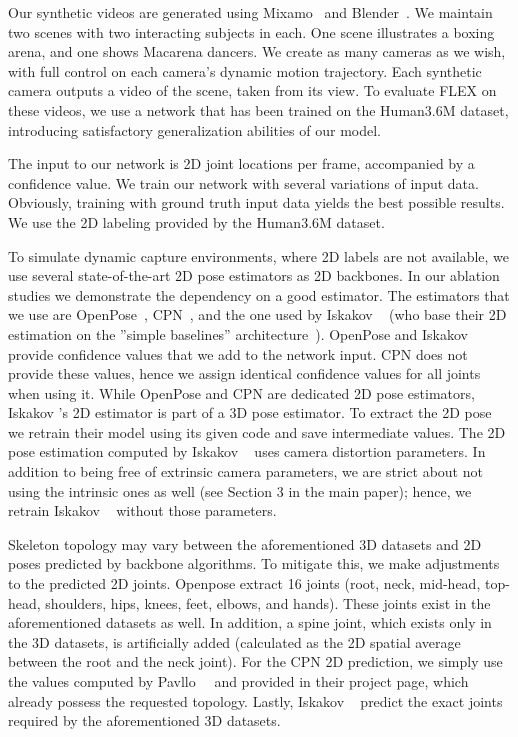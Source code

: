 Our synthetic videos are generated using Mixamo~\cite{mixamo} and Blender~\cite{blender}. We maintain two scenes with two interacting subjects in each. One scene illustrates a boxing arena, and one shows Macarena dancers. We create as many cameras as we wish, with full control on each camera's dynamic motion trajectory. Each synthetic camera outputs a video of the scene, taken from its view. To evaluate FLEX on these videos, we use a network that has been trained on the Human3.6M dataset, introducing satisfactory generalization abilities of our model.

 The input to our network is 2D joint locations per frame, accompanied by a confidence value. We train our network with several variations of input data.
 Obviously, training with ground truth input data yields the best possible results. We use the 2D labeling provided by the Human3.6M dataset. 

 To simulate dynamic capture environments, where 2D labels are not available, we use several state-of-the-art 2D pose estimators as 2D backbones. In our ablation studies we demonstrate the dependency on a good estimator. The estimators that we use are OpenPose~\cite{Cao:2018}, CPN~\cite{chen2018cascaded}, and the one used by Iskakov \etal~ (who base their 2D estimation on the ”simple baselines” architecture~\cite{xiao2018simple}). 
OpenPose and Iskakov \etal provide confidence values that we add to the network input. CPN does not provide these values, hence we assign identical confidence values for all joints when using it.
%
While OpenPose and CPN are dedicated 2D pose estimators, Iskakov \etal's 2D estimator is part of a 3D pose estimator. To extract the 2D pose we retrain their model using its given code and save intermediate values.
The 2D pose estimation computed by Iskakov \etal~ uses camera distortion parameters. In addition to being free of extrinsic camera parameters, we are strict about not using the intrinsic ones as well (see Section 3 in the main paper); hence, we retrain Iskakov \etal~ without those parameters.

Skeleton topology may vary between the aforementioned 3D datasets and 2D poses predicted by backbone algorithms. To mitigate this, we make adjustments to the predicted 2D joints. Openpose \cite{Cao:2018} extract 16 joints (root, neck, mid-head, top-head, shoulders, hips, knees, feet, elbows, and hands). These joints exist in the aforementioned datasets as well. In addition, a spine joint, which exists only in the 3D datasets, is artificially added (calculated as the 2D spatial average between the root and the neck joint).
For the CPN \cite{chen2018cascaded} 2D prediction, we simply use the values computed by Pavllo~\etal~\cite{pavllo20193d} and provided in their project page, which already possess the requested topology. Lastly, Iskakov \etal~ predict the exact joints required by the aforementioned 3D datasets.

